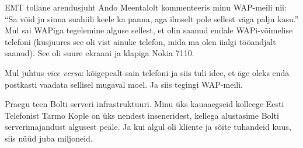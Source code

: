 EMT tollane arendusjuht Ando Meentalolt kommenteeris minu WAP-meili nii: \enquote{Sa võid ju sinna suahiili keele ka panna, aga 
ilmselt pole sellest väga palju kasu.} Mul sai WAPiga tegelemine 
alguse sellest, et olin saanud endale WAPi-võimelise telefoni (kusjuures see oli vist ainuke telefon, mida ma olen iialgi tööandjalt saanud). See oli suure ekraani ja klapiga
Nokia 7110. 


Mul juhtus \emph{vice versa}: kõigepealt sain telefoni ja siis 
tuli idee, et äge oleks enda postkasti vaadata sellisel mugaval moel. Ja siis tegingi 
WAP-meili.


Praegu teen Bolti serveri infrastruktuuri. Minu üks kauaaegseid 
kolleege Eesti Telefonist Tarmo Kople on 
üks nendest inseneridest, kellega alustasime Bolti 
serverimajandust algusest peale. Ja kui algul oli kliente ja sõite tuhandeid kuus, siis nüüd juba miljoneid.
